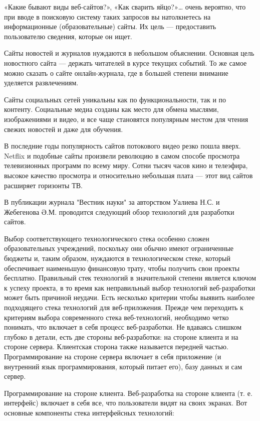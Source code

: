 «Какие бывают виды веб-сайтов?», «Как сварить яйцо?»… очень вероятно, что при вводе в поисковую систему таких запросов вы натолкнетесь на информационные (образовательные) сайты.
Их цель — предоставить пользователю сведения, которые он ищет.

Сайты новостей и журналов нуждаются в небольшом объяснении.
Основная цель новостного сайта — держать читателей в курсе текущих событий.
То же самое можно сказать о сайте онлайн-журнала, где в большей степени внимание уделяется развлечениям.

Сайты социальных сетей уникальны как по функциональности, так и по контенту.
Социальные медиа созданы как место для обмена мыслями, изображениями и видео, и все чаще становятся популярным местом для чтения свежих новостей и даже для обучения.

В последние годы популярность сайтов потокового видео резко пошла вверх.
Netflix и подобные сайты произвели революцию в самом способе просмотра телевизионных программ по всему миру.
Сотни тысяч часов кино и телеэфира, высокое качество просмотра и относительно небольшая плата — этот вид сайтов расширяет горизонты ТВ.

В публикации \cite{ualiev-jebegenov-issledovanie} журнала "Вестник науки" за авторством Уалиева Н.С. и Жебегенова Ә.М. проводится следующий обзор технологий для разработки сайтов.

Выбор соответствующего технологического стека особенно сложен образовательных учреждений, поскольку они обычно имеют ограниченные бюджеты и, таким образом, нуждаются в технологическом стеке, который обеспечивает наименьшую финансовую трату, чтобы получить свои проекты бесплатно.
Правильный стек технологий в значительной степени является ключом к успеху проекта, в то время как неправильный выбор технологий веб-разработки может быть причиной неудачи.
Есть несколько критерии чтобы выявить наиболее подходящего стека технологий для веб-приложения.
Прежде чем переходить к критериям выбора современного стека веб-технологий, необходимо четко понимать, что включает в себя процесс веб-разработки.
Не вдаваясь слишком глубоко в детали, есть две стороны веб-разработки: на стороне клиента и на стороне сервера.
Клиентская сторона также называется передней частью.
Программирование на стороне сервера включает в себя приложение (и внутренний язык программирования, который питает его), базу данных и сам сервер.

Программирование на стороне клиента.
Веб-разработка на стороне клиента (т. е. интерфейс) включает в себя все, что пользователи видят на своих экранах. Вот основные компоненты стека интерфейсных технологий:

